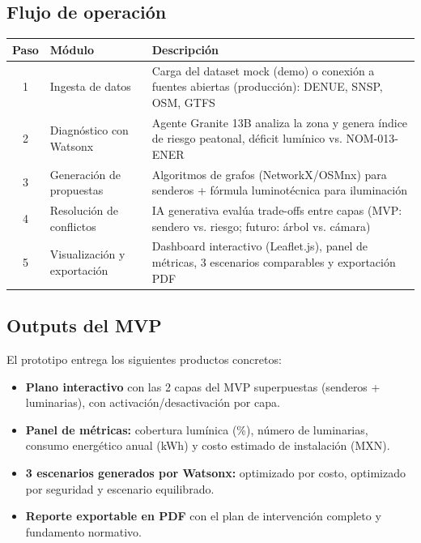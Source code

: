 \documentclass[12pt,a4paper]{article}
\begin{document}
\subsection{Flujo de operación}

\begin{table}[H]
\centering
\small
\renewcommand{\arraystretch}{1.3}
\begin{tabularx}{\textwidth}{c l X}
\toprule
\rowcolor{azuloscuro}
\color{white}\textbf{Paso} & \color{white}\textbf{Módulo} & \color{white}\textbf{Descripción} \\
\midrule
1 & Ingesta de datos & Carga del dataset mock (demo) o conexión a fuentes abiertas (producción): DENUE, SNSP, OSM, GTFS \\
\rowcolor{fondoazul}
2 & Diagnóstico con Watsonx & Agente Granite 13B analiza la zona y genera índice de riesgo peatonal, déficit lumínico vs. NOM-013-ENER \\
3 & Generación de propuestas & Algoritmos de grafos (NetworkX/OSMnx) para senderos + fórmula luminotécnica para iluminación \\
\rowcolor{fondoazul}
4 & Resolución de conflictos & IA generativa evalúa trade-offs entre capas (MVP: sendero vs. riesgo; futuro: árbol vs. cámara) \\
5 & Visualización y exportación & Dashboard interactivo (Leaflet.js), panel de métricas, 3 escenarios comparables y exportación PDF \\
\bottomrule
\end{tabularx}
\end{table}

\subsection{Outputs del MVP}

El prototipo entrega los siguientes productos concretos:

\begin{itemize}[leftmargin=1.5cm, itemsep=4pt]
  \item \textbf{Plano interactivo} con las 2 capas del MVP superpuestas (senderos + luminarias), con activación/desactivación por capa.
  \item \textbf{Panel de métricas:} cobertura lumínica (\%), número de luminarias, consumo energético anual (kWh) y costo estimado de instalación (MXN).
  \item \textbf{3 escenarios generados por Watsonx:} optimizado por costo, optimizado por seguridad y escenario equilibrado.
  \item \textbf{Reporte exportable en PDF} con el plan de intervención completo y fundamento normativo.
\end{itemize}
\end{document}
